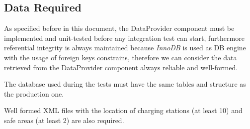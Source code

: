 \subsection{Data Required}
As specified before in this document, the DataProvider component must be implemented and unit-tested before  any integration test can start, furthermore referential integrity is always maintained because \emph{InnoDB} is used as DB engine with the usage of foreign keys constrains, therefore we can consider the data retrieved from the DataProvider component always reliable and well-formed.

The database used during the tests must have the same tables and structure as the production one.

Well formed XML files with the location of charging stations (at least 10) and safe areas (at least 2) are also required.

